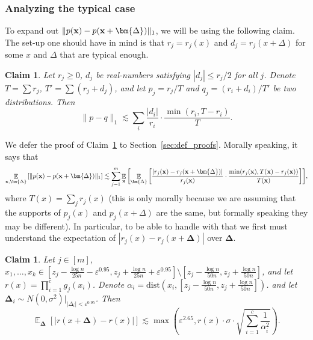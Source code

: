 \documentclass[10pt,a4paper]{article}
\newtheorem{claim}[thm]{Claim}
\newcommand\E{\mathop{\mathbb{E}}}
\newcommand\card[1]{\left| {#1} \right|}
\newcommand\Expect[2]{{\mathop{\mathbb{E}}_{#1}\left[ {#2} \right]}}
\newcommand\norm[1]{\| #1 \|}
\newcommand\eps{\varepsilon}
\renewcommand\geq{\geqslant}
\renewcommand\leq{\leqslant}
\newcommand{\al}{\alpha}
\newcommand{\De}{\Delta}
\newcommand{\ve}{\varepsilon}
\def\ll{\lesssim}
\begin{document}
\subsubsection{Analyzing the typical case}
To expand out $\norm{p({\bf x}) - p({\bf x}+\bm{\De})}_1$, we will be using the following claim. The set-up one should
have in mind is that $r_j = r_j(x)$ and $d_j = r_j(x+\De)$ for some $x$ and $\De$ that are typical enough.
\begin{claim} \label{cl:A-6}
	Let $r_j\geq 0$, $d_j$ be real-numbers satisfying $\card{d_j}\leq r_j/2$ for all $j$.
    Denote $T=\sum r_j$, $T'=\sum (r_j+d_j)$, and let $p_j = r_j/T$ and $q_j = (r_i+d_i)/T'$ be two distributions.
    Then
	\begin{equation}\label{eq:cl:A-6:0}
	\norm{p-q}_1 \ll \sum_i \frac{|d_i|}{r_i} \cdot \frac{\min(r_i, T-r_i)}{T}.
	\end{equation}
\end{claim}
We defer the proof of Claim~\ref{cl:A-6} to Section~\ref{sec:def_proofs}. Morally speaking, it says that
\begin{equation}\label{eq:pretend1}
\Expect{{\bf x},\bm{\De}}{\norm{p({\bf x}) - p({\bf x}+\bm{\De})}_1}
\ll \sum\limits_{j=1}^{m}{\Expect{{\bf x}}{\Expect{\bm{\De}}{\frac{\card{r_j({\bf x}) - r_j({\bf x}+\bm{\De})}}{r_j({\bf x})}\cdot\frac{\min(r_j({\bf x}),T({\bf x})-r_j({\bf x}))}{T({\bf x})}}}},
\end{equation}
where $T(x) = \sum\limits_{j}{r_j(x)}$ (this is only morally because we are assuming that the supports of $p_j(x)$ and $p_j(x+\De)$
are the same, but formally speaking they may be different). In particular, to be able to handle with that we first must understand
the expectation of $\card{r_j(x) - r_j(x+\bm{\De})}$ over $\bm{\De}$.
\begin{claim}\label{cl:A-4}
    Let $j\in [m]$,  $x_1,\ldots,x_k \in [z_j-\frac{\log n}{25 n}-\eps^{0.95},z_j+\frac{\log n}{25 n}+\eps^{0.95}] \setminus [z_j-\frac{\log n}{50 n},z_j+\frac{\log n}{50 n}]$,
    and let $r(x)=\prod_{i=1}^c g_j(x_i)$.
	Denote $\al_i =\text{dist}\left(x_i, [z_j-\frac{\log n}{50n},z_j+\frac{\log n}{50n}]\right)$.
	and let $\bm{\De}_i \sim N(0,\sigma^2)|_{|\De_i|<\ve^{0.95}}$.
	Then
	\begin{equation}
	\E_{\bm{\De}}[|r(x+\bm{\De})-r(x)|] \ll \max\left(\eps^{2.65},r(x)\cdot \sigma\cdot\sqrt{\sum_{i=1}^c \frac{1}{\al_i^2}}\right).
	\end{equation}
\end{claim}
\end{document}
